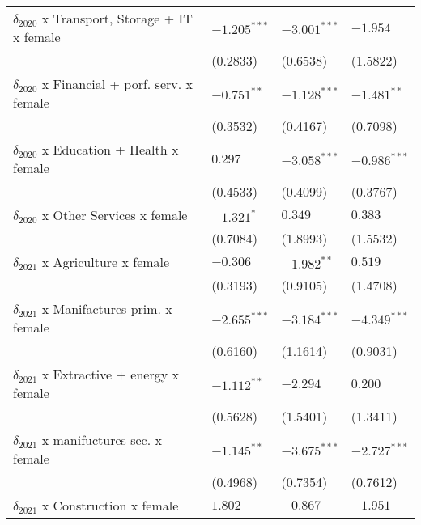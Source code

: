 \begin{tabular}{llll}
$\delta_{2020}$ x Transport, Storage + IT x female &     $-1.205^{***}$ &     $-3.001^{***}$ &           $-1.954$ \\
                                                   &           (0.2833) &           (0.6538) &           (1.5822) \\
$\delta_{2020}$ x Financial + porf. serv. x female &      $-0.751^{**}$ &     $-1.128^{***}$ &      $-1.481^{**}$ \\
                                                   &           (0.3532) &           (0.4167) &           (0.7098) \\
$\delta_{2020}$ x Education + Health x female      &            $0.297$ &     $-3.058^{***}$ &     $-0.986^{***}$ \\
                                                   &           (0.4533) &           (0.4099) &           (0.3767) \\
$\delta_{2020}$ x Other Services x female          &         $-1.321^*$ &            $0.349$ &            $0.383$ \\
                                                   &           (0.7084) &           (1.8993) &           (1.5532) \\
$\delta_{2021}$ x Agriculture x female             &           $-0.306$ &      $-1.982^{**}$ &            $0.519$ \\
                                                   &           (0.3193) &           (0.9105) &           (1.4708) \\
$\delta_{2021}$ x Manifactures prim. x female      &     $-2.655^{***}$ &     $-3.184^{***}$ &     $-4.349^{***}$ \\
                                                   &           (0.6160) &           (1.1614) &           (0.9031) \\
$\delta_{2021}$ x Extractive + energy x female     &      $-1.112^{**}$ &           $-2.294$ &            $0.200$ \\
                                                   &           (0.5628) &           (1.5401) &           (1.3411) \\
$\delta_{2021}$ x manifuctures sec. x female       &      $-1.145^{**}$ &     $-3.675^{***}$ &     $-2.727^{***}$ \\
                                                   &           (0.4968) &           (0.7354) &           (0.7612) \\
$\delta_{2021}$ x Construction x female            &            $1.802$ &           $-0.867$ &           $-1.951$ \\

\end{tabular}
